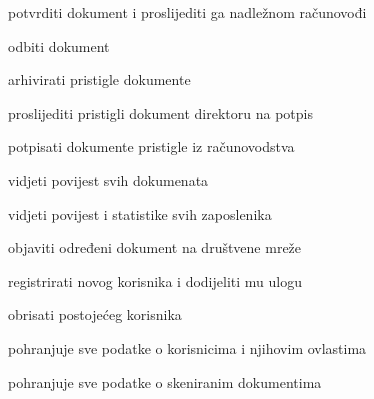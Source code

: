 \begin{packed_enum}
\begin{packed_enum}
\begin{packed_enum}
							\item potvrditi dokument i proslijediti ga nadležnom računovođi
							\item odbiti dokument

						\end{packed_enum}
					
				\end{packed_enum}

				\item  {}

				\begin{packed_enum}
					
					\item arhivirati pristigle dokumente
					\item proslijediti pristigli dokument direktoru na potpis
					
				\end{packed_enum}

				\item  {}

				\begin{packed_enum}
					
					\item potpisati dokumente pristigle iz računovodstva
					\item vidjeti povijest svih dokumenata
					\item vidjeti povijest i statistike svih zaposlenika
					\item objaviti određeni dokument na društvene mreže 
					\item registrirati novog korisnika i dodijeliti mu ulogu
					\item obrisati postojećeg korisnika
					
				\end{packed_enum}

				\item  {}

				\begin{packed_enum}

					\item pohranjuje sve podatke o korisnicima i njihovim ovlastima
					\item pohranjuje sve podatke o skeniranim dokumentima
					
				\end{packed_enum}			

			\end{packed_enum}
			
